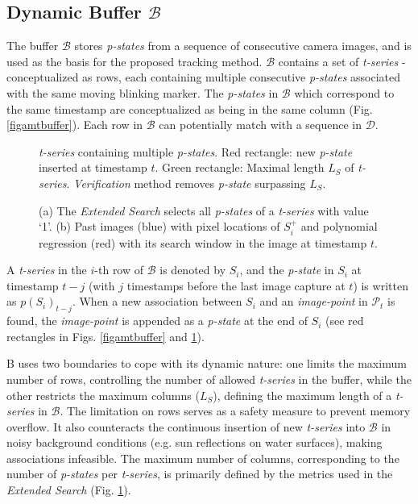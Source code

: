 \documentclass[lettersize,preprint]{elsarticle}
\newcommand{\B}{$\mathcal{B}$}
\newcommand{\D}{$\mathcal{D}$}
\newcommand{\ps}{\emph{p-state}}
\newcommand{\ts}{\emph{t-series}}
\begin{document}
\subsection{Dynamic Buffer \B{}}\label{subsecamtbuffer}

The buffer \B{} stores \emph{p-states} from a sequence of consecutive camera images, and is used as the basis for the proposed tracking method.
\B{} contains a set of \ts{} - conceptualized as rows, each containing multiple consecutive \emph{p-states} associated with the same moving blinking marker.
The \emph{p-states} in \B{} which correspond to the same timestamp are conceptualized as being in the same column (Fig. \ref{figamtbuffer}).
Each row in \B{} can potentially match with a sequence in \D{}.
\begin{figure}[b]
  \centering
  \vspace{-4pt}
  \scalebox{0.521}{}
  \vspace{-3mm}
  \caption{\ts{} containing multiple \emph{p-states}. Red rectangle: new \ps{} inserted at timestamp $t$. Green rectangle: Maximal length $L_S$ of \ts{}. \emph{Verification} method removes \ps{} surpassing $L_S$.}
  \label{figamtbuffer_detailed}
\end{figure}
\begin{figure}[ht]
  \centering
  \vspace{-8pt}
  \subfloat[]{\scalebox{0.6}{}%
  \label{figamtextended_search}}
  \hfil
  \subfloat[]{\scalebox{0.2}{}%
  \label{figamtextended_search_2}}
  \caption{(a) The \emph{Extended Search} selects all \emph{p-states} of a \ts{} with value `1'. (b) Past images (blue) with pixel locations of $S_i^+$ and polynomial regression (red) with its search window in the image at timestamp $t$.}
  \label{fig_sim}
  \vspace{-15pt}
\end{figure}
A \ts{} in the $i$-th row of \B{} is denoted by $S_i$, and the \ps{} in $S_i$ at timestamp $t-j$ (with $j$ timestamps before the last image capture at $t$) is written as $p(S_i)_{t-j}$.
When a new association between $S_i$ and an \emph{image-point} in $\mathcal{P}_t$ is found, the \emph{image-point} is appended as a \ps{} at the end of $S_i$ (see red rectangles in Figs. \ref{figamtbuffer} and \ref{figamtbuffer_detailed}).

B{} uses two boundaries to cope with its dynamic nature: one limits the maximum number of rows, controlling the number of allowed \ts{} in the buffer, while the other restricts the maximum columns ($L_S$), defining the maximum length of a \ts{} in \B{}.
The limitation on rows serves as a safety measure to prevent memory overflow. It also counteracts the continuous insertion of new \ts{} into \B{} in noisy background conditions (e.g. sun reflections on water surfaces), making associations infeasible.
The maximum number of columns, corresponding to the number of \emph{p-states} per \ts{}, is primarily defined by the metrics used in the \emph{Extended Search} (Fig. \ref{figamtbuffer_detailed}).
\end{document}
